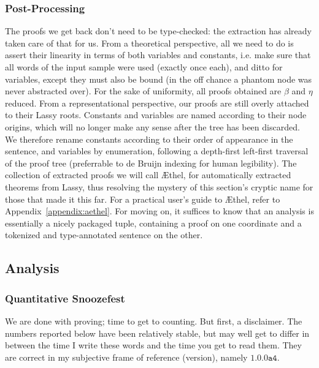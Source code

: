 \subsubsection{Post-Processing}
The proofs we get back don't need to be type-checked: the extraction has already taken care of that for us.
From a theoretical perspective, all we need to do is assert their linearity in terms of both variables and constants, i.e. make sure that all words of the input sample were used (exactly once each), and ditto for variables, except they must also be bound (in the off chance a phantom node was never abstracted over).
For the sake of uniformity, all proofs obtained are $\beta$ and $\eta$ reduced.
From a representational perspective, our proofs are still overly attached to their Lassy roots.
Constants and variables are named according to their node origins, which will no longer make any sense after the tree has been discarded.
We therefore rename constants according to their order of appearance in the sentence, and variables by enumeration, following a depth-first left-first traversal of the proof tree (preferrable to de Bruijn indexing for human legibility).
The collection of extracted proofs we will call \AE thel, for automatically extracted theorems from Lassy, thus resolving the mystery of this section's cryptic name for those that made it this far.
For a practical user's guide to \AE thel, refer to Appendix~\ref{appendix:aethel}.
For moving on, it suffices to know that an analysis is essentially a nicely packaged tuple, containing a proof on one coordinate and a tokenized and type-annotated sentence on the other.

\subsection{Analysis}
\subsubsection{Quantitative Snoozefest}
We are done with proving; time to get to counting.
But first, a disclaimer.
The numbers reported below have been relatively stable, but may well get to differ in between the time I write these words and the time you get to read them.
They are correct in my subjective frame of reference (version), namely $\mathtt{1.0.0a4}$. 

